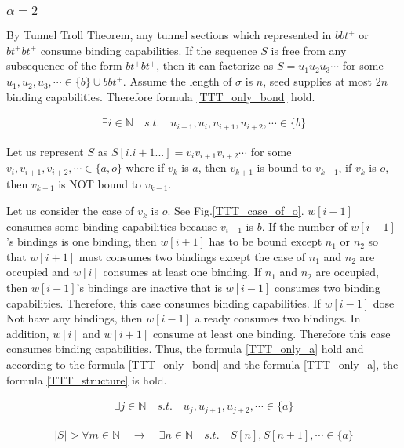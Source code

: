\documentclass[runningheads]{llncs}
\begin{document}
\subsubsection{$\alpha = 2$}


By Tunnel Troll Theorem, any tunnel sections which represented in $bbt^+$ or $bt^+bt^+$ consume binding capabilities. If the sequence $S$ is free from any subsequence of the form $bt^+bt^+$, then it can factorize as $S = u_1 u_2 u_3 \cdots$ for some $u_1 , u_2 , u_3 , \cdots \in \{b\} \cup bbt^+$. Assume the length of $\sigma$ is $n$, seed supplies at most $2n$ binding capabilities. Therefore formula \ref{TTT_only_bond} hold.

\begin{eqnarray}
  \exists i \in \mathbb{N} \quad s.t. \quad u_{i-1} , u_i , u_{i+1} , u_{i+2} , \cdots \in \{ b \}
  \label{TTT_only_bond}
\end{eqnarray}


Let us represent $S$ as $S[i.i+1...] = v_i v_{i+1} v_{i+2} \cdots$ for some $v_i, v_{i+1}, v_{i+2}, \cdots \in \{ a, o\}$ where if $v_k$ is $a$, then $v_{k+1}$ is bound to $v_{k-1}$, if $v_k$ is $o$, then $v_{k+1}$ is NOT bound to $v_{k-1}$.


Let us consider the case of $v_k$ is $o$. See Fig.\ref{TTT_case_of_o}. $w[i-1]$ consumes some binding capabilities because $v_{i-1}$ is $b$. If the number of $w[i-1]$'s bindings is one binding, then $w[i+1]$ has to be bound except $n_1$ or $n_2$ so that $w[i+1]$ must consumes two bindings except the case of $n_1$ and $n_2$ are occupied and $w[i]$ consumes at least one binding. If $n_1$ and $n_2$ are occupied, then $w[i-1]$'s bindings are inactive that is $w[i-1]$ consumes two binding capabilities. Therefore, this case consumes binding capabilities. If $w[i-1]$ dose Not have any bindings, then $w[i-1]$ already consumes two bindings. In addition, $w[i]$ and $w[i+1]$ consume at least one binding. Therefore this case consumes binding capabilities. Thus, the formula \ref{TTT_only_a} hold and according to the formula \ref{TTT_only_bond} and the formula \ref{TTT_only_a}, the formula \ref{TTT_structure} is hold.

\begin{eqnarray}
  \exists j \in \mathbb{N} \quad s.t. \quad u_j , u_{j+1} , u_{j+2} , \cdots \in \{ a \}
  \label{TTT_only_a}
\end{eqnarray}

\begin{eqnarray}
  | S | > \forall m \in \mathbb{N} \quad \to \quad \exists n \in \mathbb{N} \quad s.t. \quad S[n], S[n+1], \cdots \in \{ a \}
  \label{TTT_structure}
\end{eqnarray}
\end{document}
